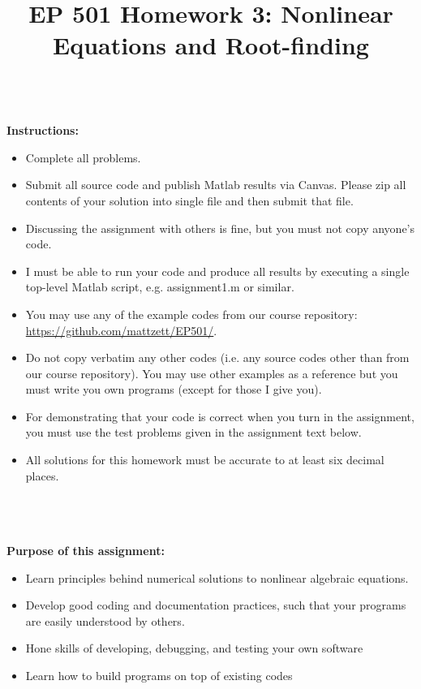 \documentclass{article}
\begin{document}
\title{EP 501 Homework 3:  Nonlinear Equations and Root-finding}

\maketitle

~\\
\textbf{Instructions:}  
\begin{itemize}
  \item Complete all problems.
  \item Submit all source code and publish Matlab results via Canvas.  Please zip all contents of your solution into single file and then submit that file.    
  \item Discussing the assignment with others is fine, but you must not copy anyone's code.  
  \item I must be able to run your code and produce all results by executing a single top-level Matlab script, e.g. \textsf{assignment1.m} or similar.  
  \item You may use any of the example codes from our course repository:  \url{https://github.com/mattzett/EP501/}.
  \item Do not copy verbatim any other codes (i.e. any source codes other than from our course repository).  You may use other examples as a reference but you must write you own programs (except for those I give you).  
    \item For demonstrating that your code is correct when you turn in the assignment, you must use the test problems given in the assignment text below.  
    \item  All solutions for this homework must be accurate to at least six decimal places.  

\end{itemize}
~\\~\\~\\
\textbf{Purpose of this assignment:}  
\begin{itemize}
  \item Learn principles behind numerical solutions to nonlinear algebraic equations.  
  \item Develop good coding and documentation practices, such that your programs are easily understood by others.  
  \item Hone skills of developing, debugging, and testing your own software
  \item Learn how to build programs on top of existing codes
\end{itemize}
\end{document}
